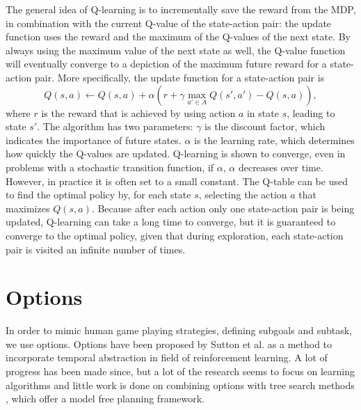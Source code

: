 The general idea of Q-learning is to incrementally save the reward from the MDP,
in combination with the current Q-value of the state-action pair: the update
function uses the reward and the maximum of the Q-values of the next state. By
always using the maximum value of the next state as well, the Q-value function
will eventually converge to a depiction of the maximum future reward for a
state-action pair. More specifically, the update function for a state-action
pair is
\begin{equation}
	\label{eq:qlearning}
	Q(s, a) \gets Q(s, a) + \alpha \left(r + \gamma \max_{a' \in A} Q(s', a') - Q(s, a)\right),
\end{equation}
where $r$ is the reward that is achieved by using action $a$ in state $s$,
leading to state $s'$. The algorithm has two parameters: $\gamma$ is the
discount factor, which indicates the importance of future states. $\alpha$ is the
learning rate, which determines how quickly the Q-values are updated.
Q-learning is shown to converge, even in problems with a stochastic transition
function, if $\alpha$, $\alpha$ decreases over time. However, in practice it is
often set to a small constant. The Q-table can be used to find the optimal
policy by, for each state $s$, selecting the action $a$ that maximizes $Q(s,
a)$. Because after each action only one state-action pair is being updated,
Q-learning can take a long time to converge, but it is guaranteed to converge to
the optimal policy, given that during exploration, each state-action pair is
visited an infinite number of times.

\section{Options}
\label{subsec:options}


In order to mimic human game playing strategies, defining subgoals and subtask,
we use options. Options have been proposed by Sutton et al.
\cite{sutton1999between} as a method to incorporate temporal abstraction in
field of reinforcement learning. A lot of progress has been made since, but a
lot of the research seems to focus on learning algorithms and little work is
done on combining options with tree search methods \cite{barto2003recent}, which
offer a model free planning framework.

